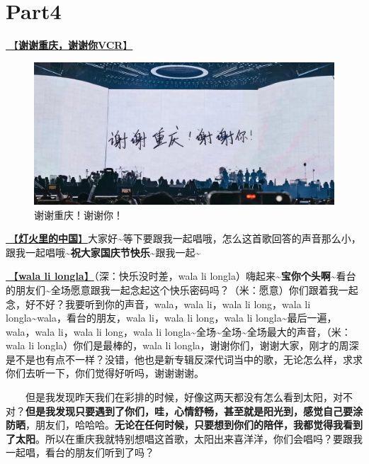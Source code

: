 \documentclass[]{ctexbook}
\begin{document}
\section{Part4}\label{chongqing-20241006-part4}

\hyperref[thank-you-vcr]{🎥【\textbf{谢谢重庆，谢谢你VCR}】}

\begin{figure}

{\centering \includegraphics[width=400pt]{img/chongqing20241006/thank-chongqing} 

}

\caption{谢谢重庆！谢谢你！}\label{fig:unnamed-chunk-116}
\end{figure}

\hyperref[China-in-the-lights]{🎵【\textbf{灯火里的中国}】}大家好\textasciitilde 等下要跟我一起唱哦，怎么这首歌回答的声音那么小，跟我一起唱哦\textasciitilde{}\textbf{祝大家国庆节快乐\textasciitilde{}}跟我一起\textasciitilde{}

\hyperref[wala-li-longla]{🎵【\textbf{wala li longla}】}（深：快乐没时差，wala li longla）嗨起来\textasciitilde{}\textbf{宝你个头啊\textasciitilde{}}看台的朋友们\textasciitilde 全场愿意跟我一起念起这个快乐密码吗？（米：愿意）你们跟着我一起念，好不好？我要听到你的声音，wala，wala li，wala li long，wala li longla\textasciitilde wala，看台的朋友，wala li，wala li long，wala li longla\textasciitilde 最后一遍，wala，wala li，wala li long，wala li longla\textasciitilde 全场\textasciitilde 全场\textasciitilde 全场最大的声音，（米：wala li longla）你们是最棒的，wala li longla，谢谢你们，谢谢大家，刚才的周深是不是也有点不一样？没错，他也是新专辑反深代词当中的歌，无论怎么样，求求你们去听一下，你们觉得好听吗，谢谢谢谢。

  但是我发现昨天我们在彩排的时候，好像这两天都没有怎么看到太阳，对不对？\textbf{但是我发现只要遇到了你们，哇，心情舒畅，甚至就是阳光到，感觉自己要涂防晒}，朋友们，哈哈哈。\textbf{无论在任何时候，只要想到你们的陪伴，我都觉得我看到了太阳}。所以在重庆我就特别想唱这首歌，太阳出来喜洋洋，你们会唱吗？要跟我一起唱，看台的朋友们听到了吗？
\end{document}
